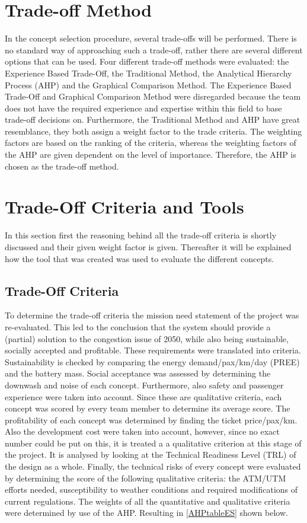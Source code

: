 \section{Trade-off Method}
In the concept selection procedure, several trade-offs will be performed. There is no standard way of approaching such a trade-off, rather there are several different options that can be used. Four different trade-off methods were evaluated: the Experience Based Trade-Off, the Traditional Method, the Analytical Hierarchy Process (AHP) and the Graphical Comparison Method. The Experience Based Trade-Off and Graphical Comparison Method were disregarded because the team does not have the required experience and expertise within this field to base trade-off decisions on. Furthermore, the Traditional Method and AHP have great resemblance, they both assign a weight factor to the trade criteria. The weighting factors are based on the ranking of the criteria, whereas the weighting factors of the AHP are given dependent on the level of importance. Therefore, the AHP is chosen as the trade-off method. 


\section{Trade-Off Criteria and Tools}
In this section first the reasoning behind all the trade-off criteria is shortly discussed and their given weight factor is given. Thereafter it will be explained how the tool that was created was used to evaluate the different concepts. 

\subsection{Trade-Off Criteria}
To determine the trade-off criteria the mission need statement of the project was re-evaluated. This led to the conclusion that the system should provide a (partial) solution to the congestion issue of 2050, while also being sustainable, socially accepted and profitable. These requirements were translated into criteria. Sustainability is checked by comparing the energy demand/pax/km/day (PREE) and the battery mass. Social acceptance was assessed by determining the downwash and noise of each concept. Furthermore, also safety and passenger experience were taken into account. Since these are qualitative criteria, each concept was scored by every team member to determine its average score. The profitability of each concept was determined by finding the ticket price/pax/km. Also the development cost were taken into account, however, since no exact number could be put on this, it is treated a a qualitative criterion at this stage of the project. It is analysed by looking at the Technical Readiness Level (TRL) of the design as a whole. Finally, the technical risks of every concept were evaluated by determining the score of the following qualitative criteria: the ATM/UTM efforts needed, susceptibility to weather conditions and required modifications of current regulations. The weights of all the quantitative and qualitative criteria were determined by use of the AHP. Resulting in \autoref{AHPtableES} shown below.

